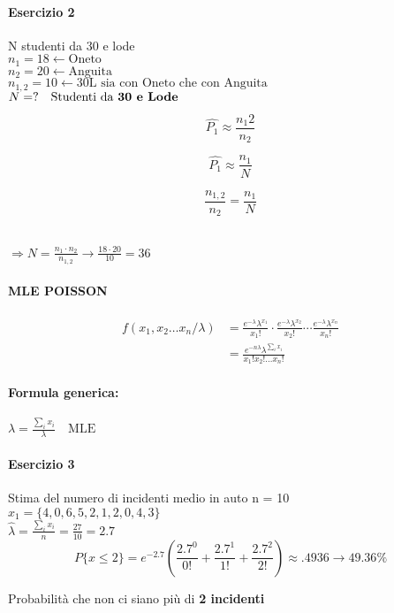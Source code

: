 \documentclass[]{article}
\newcommand{\formula}{\paragraph{Formula generica:}}
\begin{document}
    \paragraph{Esercizio 2} N studenti da 30 e lode \\
    $n_1 = 18 \leftarrow \text{Oneto}$ \\ 
    $n_2 = 20 \leftarrow \text{Anguita}$ \\
    $n_{1,2} = 10 \leftarrow \text{30L sia con Oneto che con Anguita}$ \\
    $N= ? \quad \text{Studenti da \textbf{30 e Lode}}$ \\
    \begin{minipage}{0.30\textwidth}
        \[ \hat{P_1} \approx \frac{n_1 2}{n_2} \]
    \end{minipage}
    \begin{minipage}{0.30\textwidth}
        \[ \hat{P_1} \approx \frac{n_1}{N} \]
    \end{minipage}
    \begin{minipage}{0.30\textwidth}
        \[ \frac{n_{1,2}}{n_2} = \frac{n_1}{N} \]
    \end{minipage} \\
    $ \Longrightarrow N= \frac{n_1 \cdot n_2}{n_{1,2}} \rightarrow \frac{18 \cdot 20}{10} = 36 $
    \paragraph{MLE POISSON}
    \begin{equation*}
        \begin{split}
            f(x_1, x_2 \ldots x_n / \lambda) &= \frac{e^{-\lambda} \lambda^{x_1}}{x_1 !} \cdot \frac{e^{-\lambda} \lambda^{x_2}}{x_2 !} \cdots \frac{e^{-\lambda} \lambda^{x_n}}{x_n !} \\
            &= \frac{e^{-n\lambda} \lambda^{\sum_{i}^{} x_i}}{x_1! x_2! \ldots x_n!}
        \end{split}
    \end{equation*}
    \formula
    $\lambda = \frac{\sum_{i}^{} x_i}{\lambda} \quad \text{MLE} $
    \paragraph{Esercizio 3} Stima del numero di incidenti medio in auto n = 10 \\
    $x_1 = \{ 4,0,6,5,2,1,2,0,4,3 \}$ \\
    $\hat{\lambda} = \frac{\sum_{i}^{} x_i}{n} = \frac{27}{10} = 2.7$
    \[ P\{x \leq 2 \} = e^{-2.7} (\frac{2.7^0}{0!} + \frac{2.7^1}{1!} + \frac{2.7^2}{2!}) \approx .4936 \rightarrow 49.36\% \]
    \centerline{Probabilità che non ci siano più di \textbf{2 incidenti} }
\end{document}
